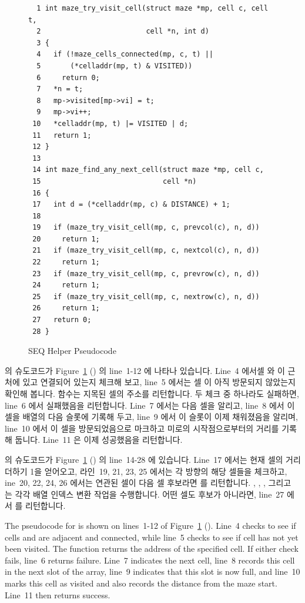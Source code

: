 \begin{figure}[tbp]
{ \scriptsize
\begin{verbatim}
  1 int maze_try_visit_cell(struct maze *mp, cell c, cell t,
  2                         cell *n, int d)
  3 {
  4   if (!maze_cells_connected(mp, c, t) ||
  5       (*celladdr(mp, t) & VISITED))
  6     return 0;
  7   *n = t;
  8   mp->visited[mp->vi] = t;
  9   mp->vi++;
 10   *celladdr(mp, t) |= VISITED | d;
 11   return 1;
 12 }
 13 
 14 int maze_find_any_next_cell(struct maze *mp, cell c,
 15                             cell *n)
 16 {
 17   int d = (*celladdr(mp, c) & DISTANCE) + 1;
 18 
 19   if (maze_try_visit_cell(mp, c, prevcol(c), n, d))
 20     return 1;
 21   if (maze_try_visit_cell(mp, c, nextcol(c), n, d))
 22     return 1;
 23   if (maze_try_visit_cell(mp, c, prevrow(c), n, d))
 24     return 1;
 25   if (maze_try_visit_cell(mp, c, nextrow(c), n, d))
 26     return 1;
 27   return 0;
 28 }
\end{verbatim}
}
\caption{SEQ Helper Pseudocode}
\label{fig:SMPdesign:SEQ Helper Pseudocode}
\end{figure}

 의 슈도코드가
Figure~\ref{fig:SMPdesign:SEQ Helper Pseudocode}
() 의 line~1-12 에 나타나
있습니다.
Line~4 에서셀  와  이 근처에 있고 연결되어 있는지 체크해 보고,
line~5 에서는 셀  이 아직 방문되지 않았는지 확인해 봅니다.
 함수는 지목된 셀의 주소를 리턴합니다.
두 체크 중 하나라도 실패하면, line~6 에서 실패했음을 리턴합니다.
Line~7 에서는 다음 셀을 알리고, line~8 에서 이 셀을  배열의
다음 슬롯에 기록해 두고, line~9 에서 이 슬롯이 이제 채워졌음을 알리며, line~10
에서 이 셀을 방문되었음으로 마크하고 미로의 시작점으로부터의 거리를 기록해
둡니다.
Line~11 은 이제 성공했음을 리턴합니다.

 의 슈도코드가
Figure~\ref{fig:SMPdesign:SEQ Helper Pseudocode}
() 의 line~14-28 에 있습니다.
Line~17 에서는 현재 셀의 거리 더하기 1을 얻어오고, 라인~19, 21, 23, 25 에서는
각 방향의 해당 셀들을 체크하고, ine~20, 22, 24, 26 에서는 연관된 셀이 다음 셀
후보라면  를 리턴합니다.
, , , 그리고  는 각각
배열 인덱스 변환 작업을 수행합니다.
어떤 셀도 후보가 아니라면, line~27 에서  를 리턴합니다.
\iffalse

The pseudocode for  is shown on lines~1-12
of Figure~\ref{fig:SMPdesign:SEQ Helper Pseudocode}
().
Line~4 checks to see if cells  and  are adjacent and connected,
while line~5 checks to see if cell  has not yet been visited.
The  function returns the address of the specified cell.
If either check fails, line~6 returns failure.
Line~7 indicates the next cell, line~8 records this cell in the next
slot of the  array, line~9 indicates that this slot
is now full, and line~10 marks this cell as visited and also records
the distance from the maze start.  Line~11 then returns success.

